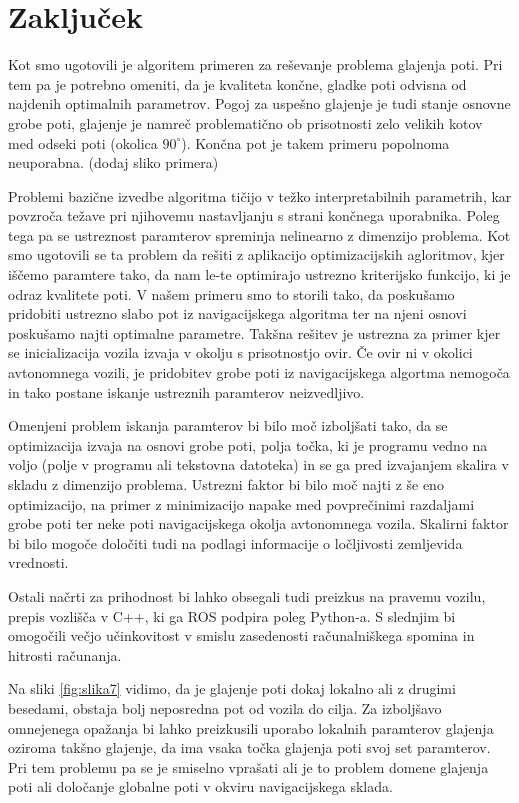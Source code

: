 \documentclass[10pt,a4paper]{article}
\begin{document}
\section{Zaključek}

Kot smo ugotovili je algoritem primeren za reševanje problema glajenja poti. Pri tem pa je potrebno omeniti, da je kvaliteta končne, gladke poti odvisna od najdenih optimalnih parametrov. Pogoj za uspešno glajenje je tudi stanje osnovne grobe poti, glajenje je namreč problematično ob prisotnosti zelo velikih kotov med odseki poti (okolica $90^{\circ}$). Končna pot je takem primeru popolnoma neuporabna. (dodaj sliko primera)

Problemi bazične izvedbe algoritma tičijo v težko interpretabilnih parametrih, kar povzroča težave pri njihovemu nastavljanju s strani končnega uporabnika. Poleg tega pa se ustreznost paramterov spreminja nelinearno z dimenzijo problema. Kot smo ugotovili se ta problem da rešiti z aplikacijo optimizacijskih agloritmov, kjer iščemo paramtere tako, da nam le-te optimirajo ustrezno kriterijsko funkcijo, ki je odraz kvalitete poti. V našem primeru smo to storili tako, da poskušamo pridobiti ustrezno slabo pot iz navigacijskega algoritma ter na njeni osnovi poskušamo najti optimalne parametre. Takšna rešitev je ustrezna za primer kjer se inicializacija vozila izvaja v okolju s prisotnostjo ovir. Če ovir ni v okolici avtonomnega vozili, je pridobitev grobe poti iz navigacijskega algortma nemogoča in tako postane iskanje ustreznih paramterov neizvedljivo.

Omenjeni problem iskanja paramterov bi bilo moč izboljšati tako, da se optimizacija izvaja na osnovi grobe poti, polja točka, ki je programu vedno na voljo (polje v programu ali tekstovna datoteka) in se ga pred izvajanjem skalira v skladu z dimenzijo problema. Ustrezni faktor bi bilo moč najti z še eno optimizacijo, na primer z minimizacijo napake med povprečinimi razdaljami grobe poti ter neke poti navigacijskega okolja avtonomnega vozila. Skalirni faktor bi bilo mogoče določiti tudi na podlagi informacije o ločljivosti zemljevida vrednosti.

Ostali načrti za prihodnost bi lahko obsegali tudi preizkus na pravemu vozilu, prepis vozlišča v C++, ki ga ROS podpira poleg Python-a. S slednjim bi omogočili večjo učinkovitost v smislu zasedenosti računalniškega spomina in hitrosti računanja. 

Na sliki \ref{fig:slika7} vidimo, da je glajenje poti dokaj lokalno ali z drugimi besedami, obstaja bolj neposredna pot od vozila do cilja. Za izboljšavo omnejenega opažanja bi lahko preizkusili uporabo lokalnih paramterov glajenja oziroma takšno glajenje, da ima vsaka točka glajenja poti svoj set paramterov. Pri tem problemu pa se je smiselno vprašati ali je to problem domene glajenja poti ali določanje globalne poti v okviru navigacijskega sklada.
\end{document}
